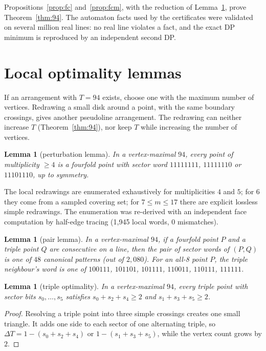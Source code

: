 \documentclass[11pt]{article}
\newtheorem{lemma}[theorem]{Lemma}
\theoremstyle{definition}
\theoremstyle{remark}
\begin{document}
Propositions~\ref{prop:fc} and~\ref{prop:fcm}, with the reduction of Lemma~\ref{lem:pert}, prove
Theorem~\ref{thm:94}. The automaton facts used by the certificates were validated on several million real lines: no
real line violates a fact, and the exact DP minimum is reproduced by an independent second DP.

\section{Local optimality lemmas}\label{sec:local}

If an arrangement with $T=94$ exists, choose one with the maximum number of vertices. Redrawing a small disk around a
point, with the same boundary crossings, gives another pseudoline arrangement. The redrawing can neither increase $T$
(Theorem~\ref{thm:94}), nor keep $T$ while increasing the number of vertices.

\begin{lemma}[perturbation lemma]\label{lem:pert}
In a vertex-maximal $94$, every point of multiplicity $\ge 4$ is a fourfold point with sector word $11111111$,
$11111110$ or $11101110$, up to symmetry.
\end{lemma}
\noindent The local redrawings are enumerated exhaustively for multiplicities $4$ and $5$; for $6$ they come from a sampled
covering set; for $7\le m\le 17$ there are explicit lossless simple redrawings. The enumeration was re-derived with an
independent face computation by half-edge tracing (1,945 local words, 0 mismatches).

\begin{lemma}[pair lemma]\label{lem:pair}
In a vertex-maximal $94$, if a fourfold point $P$ and a triple point $Q$ are consecutive on a line, then the pair of
sector words of $(P,Q)$ is one of $48$ canonical patterns (out of $2{,}080$). For an all-8 point $P$, the triple
neighbour's word is one of $100111$, $101101$, $101111$, $110011$, $110111$, $111111$.
\end{lemma}

\begin{lemma}[triple optimality]\label{lem:triopt}
In a vertex-maximal $94$, every triple point with sector bits $s_0,\dots,s_5$ satisfies $s_0+s_2+s_4\ge 2$ and
$s_1+s_3+s_5\ge 2$.
\end{lemma}
\begin{proof}
Resolving a triple point into three simple crossings creates one small triangle. It adds one side to each sector of one
alternating triple, so $\Delta T=1-(s_0+s_2+s_4)$ or $1-(s_1+s_3+s_5)$, while the vertex count grows by $2$.
\end{proof}
\end{document}
